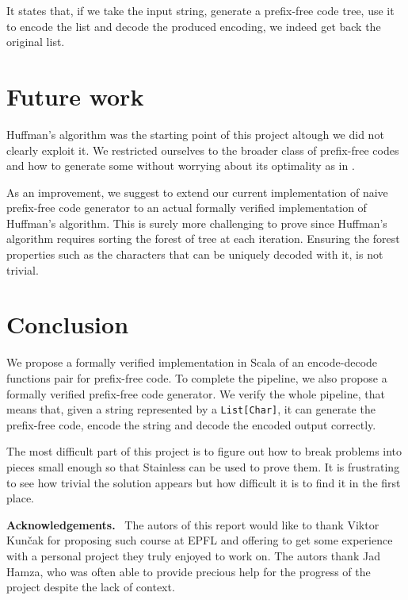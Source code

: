 \documentclass[a4paper,UKenglish,cleveref, autoref, thm-restate]{lipics-v2021}
\begin{document}
It states that, if we take the input string, generate a prefix-free code tree, use it to encode the list and decode the produced encoding, we indeed get back the original list.

\section{Future work}

Huffman's algorithm was the starting point of this project altough we did not clearly exploit it. We restricted ourselves to the broader class of prefix-free codes and how to generate some without worrying about its optimality as in \cite{blanchette}. 

As an improvement, we suggest to extend our current implementation of naive prefix-free code generator to an actual formally verified implementation of Huffman's algorithm. This is surely more challenging to prove since Huffman's algorithm requires sorting the forest of tree at each iteration. Ensuring the forest properties such as the characters that can be uniquely decoded with it, is not trivial.

\section{Conclusion}
We propose a formally verified implementation in Scala of an encode-decode functions pair for prefix-free code. To complete the pipeline, we also propose a formally verified prefix-free code generator.
We verify the whole pipeline, that means that, given a string represented by a \lstinline{List[Char]}, it can generate the prefix-free code, encode the string and decode the encoded output correctly.

The most difficult part of this project is to figure out how to break problems into pieces small enough so that Stainless can be used to prove them. 
It is frustrating to see how trivial the solution appears but how difficult it is to find it in the first place.

\vspace{0.5cm} %
\noindent %
\textbf{\large Acknowledgements.}\ %
The autors of this report would like to thank Viktor Kun\v{c}ak for proposing such course at EPFL and offering to get some experience with a personal project they truly enjoyed to work on. The autors thank Jad Hamza, who was often able to provide precious help for the progress of the project despite the lack of context.


\end{document}
